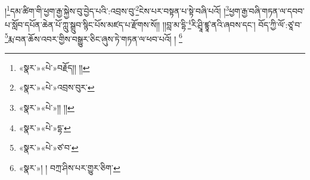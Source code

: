 །\footnote{«སྣར་»«པེ་»བརྗོད།། །།}དམ་ཚིག་གི་ཕྱག་རྒྱ་སྐྱེས་བུ་བྱེད་པའི་:འབྲས་བུ་\footnote{«སྣར་»«པེ་»འབྲས་བུར་}ངེས་པར་བསྟན་པ་སྟེ་བཞི་པའོ། །\footnote{«སྣར་»«པེ་»།། །།}ཕྱག་རྒྱ་བཞི་གཏན་ལ་དབབ་པ་སློབ་དཔོན་ཆེན་པོ་ཀླུ་སྒྲུབ་སྙིང་པོས་མཛད་པ་རྫོགས་སོ།། །།བླ་མ་དྷི་\footnote{«སྣར་»«པེ་»དྷ་}རི་ཤྲཱི་ཛྙཱ་ནའི་ཞབས་དང་། བོད་ཀྱི་ལོ་:ཙཱ་བ་\footnote{«སྣར་»«པེ་»ཙ་བ་}རྨ་བན་ཆོས་འབར་གྱིས་བསྒྱུར་ཅིང་ཞུས་ཏེ་གཏན་ལ་ཕབ་པའོ། ། \footnote{«སྣར་»། ། བཀྲ་ཤིས་པར་གྱུར་ཅིག་}